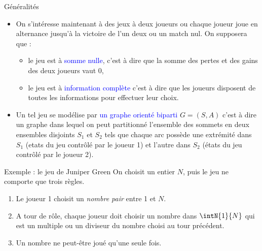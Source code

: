 \documentclass[10pt]{beamer}
\begin{document}
\begin{frame}[fragile]{\Ctitle}{\stitle}
	\begin{block}{Généralités}
		\begin{itemize}
			\item<1-> On s'intéresse maintenant à des jeux à deux joueurs ou chaque joueur joue en alternance jusqu'à la victoire de l'un deux ou un match nul. On supposera que :
			\begin{itemize}
				\item<2-> le jeu est à \textcolor{blue}{somme nulle}, c'est à dire que la somme des pertes et des gains des deux joueurs vaut 0,
				\item<3-> le jeu est à \textcolor{blue}{information complète} c'est à dire que les joueurs disposent de toutes les informations pour effectuer leur choix.
			\end{itemize}
			\item<5-> Un tel jeu se modélise par \textcolor{blue}{un graphe orienté biparti} $G = (S, A)$ c'est à dire un graphe dans lequel on peut partitionné l'ensemble des sommets en deux ensembles disjoints  $S_1$ et $S_2$ tels que chaque arc possède une extrémité dans $S_1$ (etats du jeu contrôlé par le joueur 1) et l'autre dans $S_2$ (états du jeu contrôlé par le joueur 2).
		\end{itemize} 
	\end{block}
\end{frame}

\begin{frame}[fragile]{\Ctitle}{\stitle}
	\begin{exampleblock}{Exemple : le jeu de Juniper Green}
		{\small On choisit un entier $N$, puis le jeu ne comporte que trois règles.}
		\begin{enumerate}
			\item<2-> {\small Le joueur 1 choisit un \textit{nombre pair} entre 1 et $N$.}
			\item<3-> {\small A tour de rôle, chaque joueur doit choisir un nombre dans $\intN{1}{N}$ qui est un multiple ou un diviseur du nombre choisi au tour précédent.}
			\item<4-> {\small Un nombre ne peut-être joué qu'une seule fois. }
		\end{enumerate}
	\end{exampleblock}
\end{frame}
\end{document}
